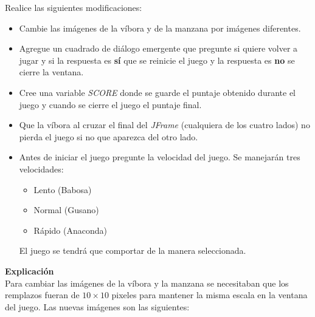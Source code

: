 \documentclass[11pt, twocolumn]{article}
\begin{document}
  Realice las siguientes modificaciones:
  \begin{itemize}
    \item Cambie las imágenes de la víbora y de la manzana por imágenes diferentes.
    \item Agregue un cuadrado de diálogo emergente que pregunte si quiere volver a jugar y si la respuesta es \textbf{sí} que se reinicie el juego y la respuesta es \textbf{no} se cierre la ventana.
    \item Cree una variable \textit{SCORE} donde se guarde el puntaje obtenido durante el juego y cuando se cierre el juego el puntaje final.
    \item Que la víbora al cruzar el final del \textit{JFrame} (cualquiera de los cuatro lados) no pierda el juego si no que aparezca del otro lado.
    \item Antes de iniciar el juego pregunte la velocidad del juego. Se manejarán tres
    velocidades:
    \begin{itemize}
      \item Lento (Babosa)
      \item Normal (Gusano)
      \item Rápido (Anaconda)
    \end{itemize}
    El juego se tendrá que comportar de la manera seleccionada.
  \end{itemize}

  \textbf{Explicación} \\
  Para cambiar las imágenes de la víbora y la manzana se necesitaban que los remplazos fueran de $10\times 10$ pixeles para mantener la misma escala en la ventana del juego. Las nuevas imágenes son las siguientes:
\end{document}
